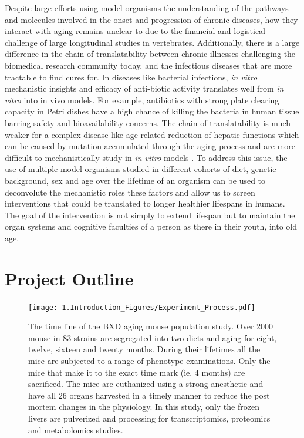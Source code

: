 \documentclass[a4paper,11pt,twoside]{book}
\begin{document}
	Despite large efforts using model organisms the understanding of the pathways and molecules involved in the onset and progression of chronic diseases, how they interact with aging remains unclear to due to the financial and logistical challenge of large longitudinal studies in vertebrates\citep{Williams2015TheAnalysis}. Additionally, there is a large difference in the chain of translatability between chronic illnesses challenging the biomedical research community today, and the infectious diseases that are more tractable to find cures for. In diseases like bacterial infections, \textit{in vitro} mechanistic insights and efficacy of anti-biotic activity translates well from \textit{in vitro} into in vivo models. For example, antibiotics with strong plate clearing capacity in Petri dishes have a high chance of killing the bacteria in human tissue barring safety and bioavailability concerns. The chain of translatability is much weaker for a complex disease like age related reduction of hepatic functions which can be caused by mutation accumulated through the aging process and are more difficult to mechanistically study in \textit{in vitro} models \citep{Moffat2017a}. To address this issue, the use of multiple model organisms studied in different cohorts of diet, genetic background, sex and age over the lifetime of an organism can be used to deconvolute the mechanistic roles these factors and allow us to screen interventions that could be translated to longer healthier lifespans in humans. The goal of the intervention is not simply to extend lifespan but to maintain the organ systems and cognitive faculties of a person as there in their youth, into old age.
	
	\section{Project Outline}
	
	\begin{figure}[htb!]
		\centering
		\texttt{[image: 1.Introduction\_Figures/Experiment\_Process.pdf]}
		\caption{The time line of the BXD aging mouse population study. Over 2000 mouse in 83 strains are segregated into two diets and aging for eight, twelve, sixteen and twenty months. During their lifetimes all the mice are subjected to a range of phenotype examinations. Only the mice that make it to the exact time mark (ie. 4 months) are sacrificed. The  mice are euthanized using a strong anesthetic and have all 26 organs harvested in a timely manner to reduce the post mortem changes in the physiology. In this study, only the frozen livers are pulverized and processing for transcriptomics, proteomics and metabolomics studies.}
		\label{fig: Outline of the BXD Aging Population Study}
	\end{figure}
	
\end{document}
